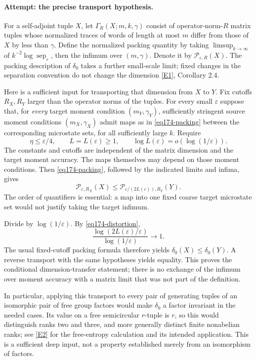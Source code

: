 \documentclass[11pt,a4paper]{article}
\newcommand{\eps}{\varepsilon}
\newcommand{\eref}[2]{\hyperlink{extra:#1:#2}{[E#2]}}
\numberwithin{equation}{section}
\begin{document}
\paragraph{Attempt: the precise transport hypothesis.}
For a self-adjoint tuple $X$, let $\Gamma_R(X;m,k,\gamma)$ consist of
operator-norm-$R$ matrix tuples whose normalized traces of words of length
at most $m$ differ from those of $X$ by less than $\gamma$.
Define the normalized packing quantity by taking $\limsup_{k\to\infty}$
of $k^{-2}\log\operatorname{sep}_\eps$, then the infimum over
$(m,\gamma)$. Denote it by $\mathcal P_{\eps,R}(X)$.
The packing description of $\delta_0$ takes a further small-scale limit;
fixed changes in the separation convention do not change the dimension
\eref{statement}{1}, Corollary 2.4.

Here is a sufficient input for transporting that dimension from $X$ to
$Y$. Fix cutoffs $R_X,R_Y$ larger than the operator norms of the tuples.
For every small $\eps$ suppose that, for \emph{every} target moment
condition $(m_Y,\gamma_Y)$, sufficiently stringent source moment conditions
$(m_X,\gamma_X)$ admit maps as in \eqref{eq174-packing} between the
corresponding microstate sets, for all sufficiently large $k$. Require
\begin{equation}\label{eq174-distortion}
 \eta\le\eps/4,\qquad L=L(\eps)\ge1,
 \qquad \log L(\eps)=o(\log(1/\eps)).
\end{equation}
The constants and cutoffs are independent of the matrix dimension and the
target moment accuracy. The maps themselves may depend on those moment
conditions. Then \eqref{eq174-packing}, followed by the indicated limits
and infima, gives
\begin{equation}\label{eq174-entropy}
 \mathcal P_{\eps,R_X}(X)
       \le \mathcal P_{\eps/(2L(\eps)),R_Y}(Y).
\end{equation}
The order of quantifiers is essential: a map into one fixed coarse target
microstate set would not justify taking the target infimum.

Divide by $\log(1/\eps)$. By \eqref{eq174-distortion},
\[
 \frac{\log(2L(\eps)/\eps)}{\log(1/\eps)}\longrightarrow1.
\]
The usual fixed-cutoff packing formula therefore yields
$\delta_0(X)\le\delta_0(Y)$. A reverse transport with the same hypotheses
yields equality. This proves the conditional dimension-transfer statement;
there is no exchange of the infimum over moment accuracy with a matrix
limit that was not part of the definition.

In particular, applying this transport to every pair of generating tuples
of an isomorphic pair of free group factors would make $\delta_0$ a factor
invariant in the needed cases. Its value on a free semicircular $r$-tuple
is $r$, so this would distinguish ranks two and three, and more generally
distinct finite nonabelian ranks; see \eref{statement}{2} for the free-entropy
calculation and its intended application. This is a sufficient deep input,
not a property established merely from an isomorphism of factors.
\end{document}
